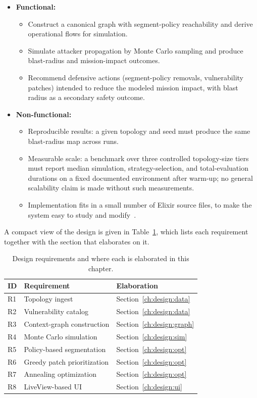 \begin{itemize}
	\item \textbf{Functional:}
	\begin{itemize}
		\item Construct a canonical graph with segment-policy reachability and derive operational flows for simulation.
		\item Simulate attacker propagation by Monte Carlo sampling and produce blast-radius and mission-impact outcomes.
		\item Recommend defensive actions (segment-policy removals, vulnerability patches) intended to reduce the modeled mission impact, with blast radius as a secondary safety outcome.
	\end{itemize}
	\item \textbf{Non-functional:}
	\begin{itemize}
		\item Reproducible results: a given topology and seed must produce the same blast-radius map across runs.
		\item Measurable scale: a benchmark over three controlled topology-size tiers must report median simulation, strategy-selection, and total-evaluation durations on a fixed documented environment after warm-up; no general scalability claim is made without such measurements.
		\item Implementation fits in a small number of Elixir source files, to make the system easy to study and modify~\cite{ou05mulval}.
	\end{itemize}
\end{itemize}

A compact view of the design is given in Table~\ref{tab:design:requirements}, which lists each requirement together with the section that elaborates on it.

\begin{table}[hbt!]
	\centering
	\begin{tabular}{lll}
		\toprule
		\textbf{ID} & \textbf{Requirement}            & \textbf{Elaboration} \\
		\midrule
		R1 & Topology ingest                 & Section~\ref{ch:design:data}       \\
		R2 & Vulnerability catalog           & Section~\ref{ch:design:data}       \\
		R3 & Context-graph construction      & Section~\ref{ch:design:graph}      \\
		R4 & Monte Carlo simulation          & Section~\ref{ch:design:sim}        \\
		R5 & Policy-based segmentation        & Section~\ref{ch:design:opt}        \\
		R6 & Greedy patch prioritization     & Section~\ref{ch:design:opt}        \\
		R7 & Annealing optimization            & Section~\ref{ch:design:opt}        \\
		R8 & LiveView-based UI               & Section~\ref{ch:design:ui}         \\
		\bottomrule
	\end{tabular}
	\caption{Design requirements and where each is elaborated in this chapter.}
	\label{tab:design:requirements}
\end{table}

